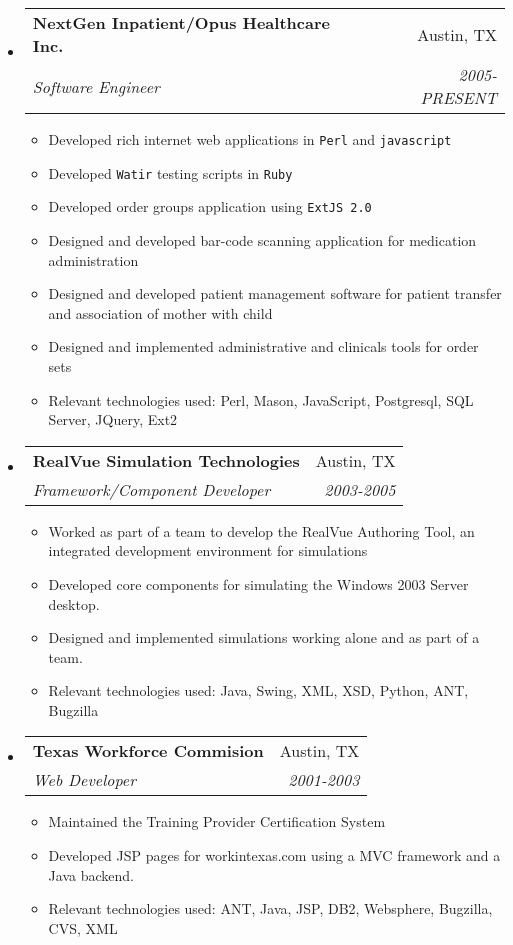 \documentclass[letterpaper,10pt]{article}
\makeatletter
\newcommand{\resitem}[1]{\item #1 \vspace{-2pt}}
\newcommand{\ressubheading}[4]{

\begin{tabular*}{6.5in}{l@{\cftdotfill{\cftsecdotsep}\extracolsep{\fill}}r}

		\textbf{#1} & #2 \\

		\textit{#3} & \textit{#4} \\

\end{tabular*}\vspace{-6pt}}
\makeatother
\begin{document}
\begin{itemize}

\item

  \ressubheading{NextGen Inpatient/Opus Healthcare Inc.}{Austin, TX}{Software Engineer}{2005-PRESENT}
  
  \begin{itemize}

    \resitem{Developed rich internet web applications in \texttt{Perl} and \texttt{javascript}}
    \resitem{Developed \texttt{Watir} testing scripts in \texttt{Ruby}}
    \resitem{Developed order groups application using \texttt{ExtJS 2.0}}
    \resitem{Designed and developed bar-code scanning application for medication
         		administration}
    \resitem{Designed and developed patient management software for patient transfer and 
		association of mother with child}
    \resitem{Designed and implemented administrative and clinicals tools for order sets}
    \resitem{Relevant technologies used: Perl, Mason, JavaScript, Postgresql, SQL Server, JQuery, Ext2}

  \end{itemize}

\item

  \ressubheading{RealVue Simulation Technologies}{Austin, TX}{Framework/Component Developer}{2003-2005}

  \begin{itemize}

    \resitem{Worked as part of a team to develop the RealVue Authoring Tool, an
      integrated development environment for simulations}
    \resitem{Developed core components for simulating the Windows 2003 Server desktop.}
    \resitem{Designed and implemented simulations working alone and as part of a team.}
    \resitem{Relevant technologies used: Java, Swing, XML, XSD, Python, ANT, Bugzilla}

  \end{itemize}

\item 

  \ressubheading{Texas Workforce Commision}{Austin, TX}{Web Developer}{2001-2003}
  \begin{itemize}
    
    \resitem{Maintained the Training Provider Certification System}
    \resitem{Developed JSP pages for workintexas.com using a MVC framework and a Java
	backend.}
    \resitem{Relevant technologies used: ANT, Java, JSP, DB2, Websphere, Bugzilla, CVS, XML}
  \end{itemize}


\end{itemize}
\end{document}
